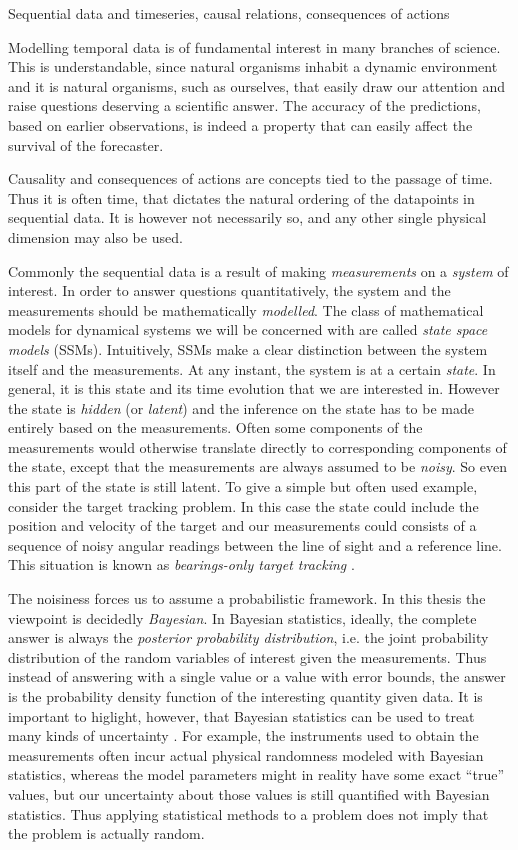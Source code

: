 Sequential data and timeseries, causal relations, consequences of actions

Modelling temporal data is of fundamental interest in many branches of science.
This is understandable, since natural organisms inhabit a dynamic environment and
it is natural organisms, such as ourselves, that easily draw our attention and raise questions
deserving a scientific answer. The accuracy of the predictions, based on earlier observations,
is indeed a property that can easily affect the survival of the forecaster.  

Causality and consequences of actions are concepts tied to the passage of time.
Thus it is often time, that dictates the natural ordering of the datapoints
in sequential data. It is however not necessarily so, and any other single
physical dimension may also be used.

Commonly the sequential data is a result of making \emph{measurements} on a
\emph{system} of interest. In order to answer questions quantitatively,
the system and the measurements should be mathematically \emph{modelled}. The class of mathematical
models for dynamical systems we will be concerned with are called \emph{state space models} (SSMs).
Intuitively, SSMs make a clear distinction between the system itself and the measurements. At any instant,
the system is at a certain \emph{state}. In general, it is this state and its time evolution that we are interested in.
However the state is \emph{hidden} (or \emph{latent}) and the inference on the state has to be made entirely
based on the measurements.  Often some components of the measurements would otherwise translate directly to corresponding components of the state,
except that the measurements are always assumed to be \emph{noisy}. So even this part of the state is still latent.
To give a simple but often used example, consider the target tracking problem. In this case the state
could include the position and velocity of the target and our measurements could consists
of a sequence of noisy angular readings between the line of sight and a reference line. This situation is
known as \emph{bearings-only target tracking} \parencite{ristic2004beyond}.

The noisiness forces us to assume a probabilistic framework. In this thesis the viewpoint
is decidedly \emph{Bayesian}. In Bayesian statistics, ideally, the complete answer
is always the \emph{posterior probability distribution}, i.e. the joint probability distribution
of the random variables of interest given the measurements. Thus instead of answering
with a single value or a value with error bounds, the answer is the probability
density function of the interesting quantity given data. It is important to higlight,
however, that Bayesian statistics can be used to treat many kinds of uncertainty
\parencite{Sarkka2012a}. For example, the instruments used to obtain the measurements often incur
actual physical randomness modeled with Bayesian statistics, whereas the model parameters might in reality have some
exact ``true'' values, but our uncertainty about those values is still quantified with
Bayesian statistics. Thus applying statistical methods to a problem does not imply
that the problem is actually random.

